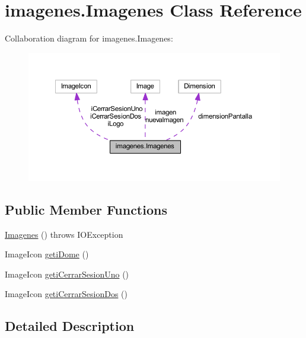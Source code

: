 \hypertarget{classimagenes_1_1_imagenes}{}\section{imagenes.\+Imagenes Class Reference}
\label{classimagenes_1_1_imagenes}


Collaboration diagram for imagenes.\+Imagenes\+:
\nopagebreak
\begin{figure}[H]
\begin{center}
\leavevmode
\includegraphics[width=350pt]{classimagenes_1_1_imagenes__coll__graph}
\end{center}
\end{figure}
\subsection*{Public Member Functions}
\begin{DoxyCompactItemize}
\item 
\mbox{\hyperlink{classimagenes_1_1_imagenes_a5306d3993cd1796bb3e7a027a5f2090c}{Imagenes}} ()  throws I\+O\+Exception 
\item 
Image\+Icon \mbox{\hyperlink{classimagenes_1_1_imagenes_a0f0caa5031d91592dd10a958b6b3bca0}{geti\+Dome}} ()
\item 
Image\+Icon \mbox{\hyperlink{classimagenes_1_1_imagenes_a35ea6dc13b089bcc087f73b5f5779219}{geti\+Cerrar\+Sesion\+Uno}} ()
\item 
Image\+Icon \mbox{\hyperlink{classimagenes_1_1_imagenes_a6ba10d5d816cbdf459d769b884940967}{geti\+Cerrar\+Sesion\+Dos}} ()
\end{DoxyCompactItemize}


\subsection{Detailed Description}


